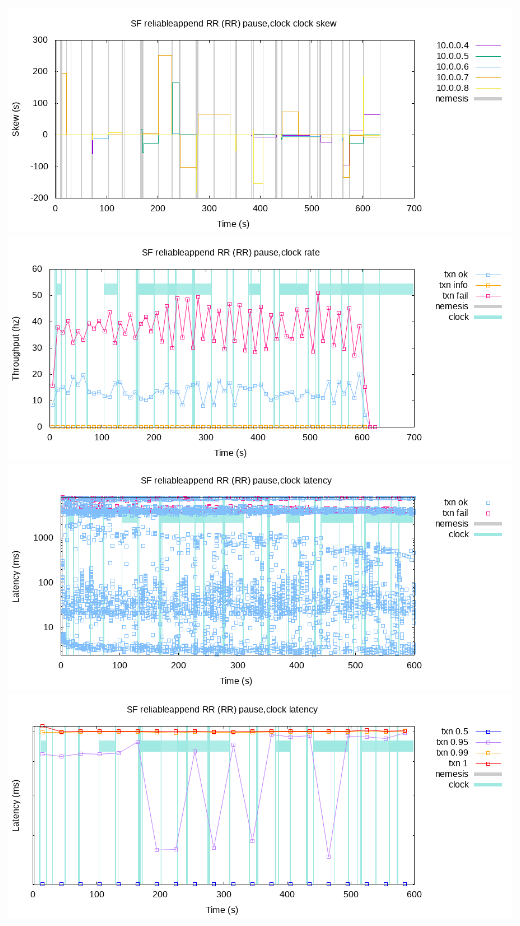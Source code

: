 \documentclass[a4paper,10pt,titlepage]{report}
\begin{document}
\includegraphics[scale=0.5]{results/clock-skew.png}
\\
\includegraphics[scale=0.5]{results/rate.png}
\\
\includegraphics[scale=0.5]{results/latency-raw.png}
\\
\includegraphics[scale=0.5]{results/latency-quantiles.png}
\end{document}
